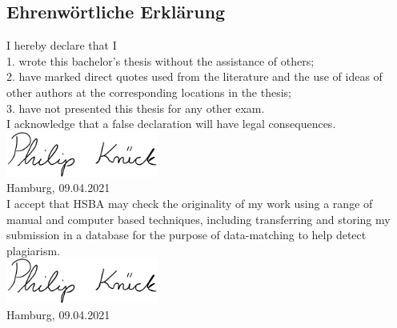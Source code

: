 \begin{center}
    \chapter*{Ehrenwörtliche Erklärung}
    \begin{flushleft}

    
    I hereby declare that I\\
    1. wrote this bachelor's thesis without the assistance of others; \\
    2. have marked direct quotes used from the literature and the use of ideas of other authors at the corresponding locations in the thesis;\\
    3. have not presented this thesis for any other exam.\\
    
    I acknowledge that a false declaration will have legal consequences.\\[1cm]
    
    \includegraphics[width=5cm]{images/signature.jpeg}\\
    Hamburg, 09.04.2021 \\[1cm]
    
    I accept that HSBA may check the originality of my work using a range of manual and computer based techniques, including transferring and storing my submission in a database for the purpose of data-matching to help detect plagiarism.
    \\[1cm]
    
    \includegraphics[width=5cm]{images/signature.jpeg}\\
    Hamburg, 09.04.2021
    \end{flushleft}
    
    
\end{center}